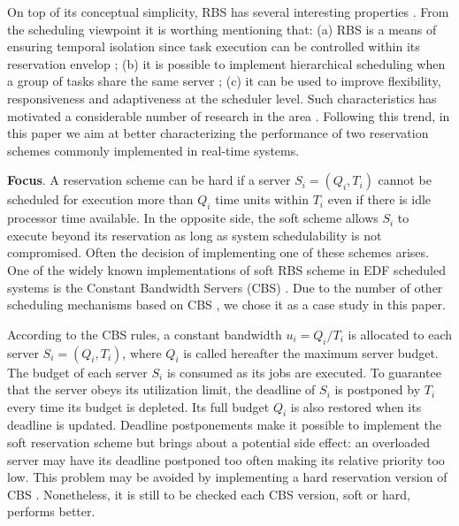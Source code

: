 \documentclass[times, 10pt,twocolumn]{article}
\begin{document}
On top of its conceptual simplicity, RBS has several interesting
properties \cite{SFLB03}. From the scheduling viewpoint it is worthing
mentioning that: (a) RBS is a means of ensuring temporal isolation
since task execution can be controlled within its reservation envelop
\cite{abeni.ea04:resource,mercer.ea94:processor,SSL89,spuri.ea96:scheduling};
(b) it is possible to implement hierarchical scheduling when a group
of tasks share the same server \cite{DB05,DB08}; (c) it can be used to
improve flexibility, responsiveness and adaptiveness at the scheduler
level.  Such characteristics has motivated a considerable number of
research in the area
\cite{abeni.ea99:adaptive,caccamo.ea00:capacity,caccamo.ea05:efficient,OCL08,OCL09,lin.ea05:improving}.
Following this trend, in this paper we aim at better characterizing
the performance of two reservation schemes commonly implemented in
real-time systems.

\textbf{Focus}.  A reservation scheme can be hard if a server $S_i =
(Q_i,T_i)$ cannot be scheduled for execution more than $Q_i$ time
units within $T_i$ even if there is idle processor time available. In
the opposite side, the soft scheme allows $S_i$ to execute beyond its
reservation as long as system schedulability is not compromised. Often
the decision of implementing one of these schemes arises. One of the
widely known implementations of soft RBS scheme in EDF scheduled
systems is the Constant Bandwidth Servers (CBS)
\cite{abeni.ea04:resource}.  Due to the number of other scheduling
mechanisms based on CBS
\cite{abeni.ea05:qos,caccamo.ea00:capacity,caccamo.ea05:efficient,LB00},
we chose it as a case study in this paper.

According to the CBS rules, a constant bandwidth $u_i = Q_i/T_i$ is
allocated to each server $S_i = (Q_i,T_i)$, where $Q_i$ is called
hereafter the maximum server budget. The budget of each server $S_i$
is consumed as its jobs are executed. To guarantee that the server
obeys its utilization limit, the deadline of $S_i$ is postponed by
$T_i$ every time its budget is depleted.  Its full budget $Q_i$ is
also restored when its deadline is updated.  Deadline postponements
make it possible to implement the soft reservation scheme but brings
about a potential side effect: an overloaded server may have its
deadline postponed too often making its relative priority too low.
This problem may be avoided by implementing a hard reservation version
of CBS \cite{buttazzo05:soft}.  Nonetheless, it is still to be checked
each CBS version, soft or hard, performs better.
\end{document}
